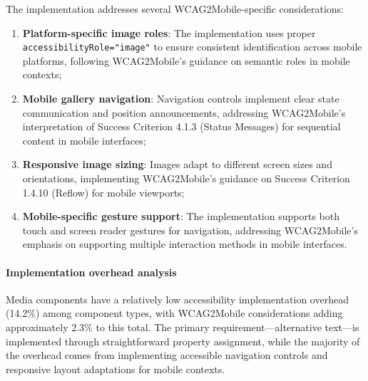 The implementation addresses several WCAG2Mobile-specific considerations:

\begin{enumerate}
    \item \textbf{Platform-specific image roles}: The implementation uses proper \texttt{accessibilityRole="image"} to ensure consistent identification across mobile platforms, following WCAG2Mobile's guidance on semantic roles in mobile contexts;
    
    \item \textbf{Mobile gallery navigation}: Navigation controls implement clear state communication and position announcements, addressing WCAG2Mobile's interpretation of Success Criterion 4.1.3 (Status Messages) for sequential content in mobile interfaces;
    
    \item \textbf{Responsive image sizing}: Images adapt to different screen sizes and orientations, implementing WCAG2Mobile's guidance on Success Criterion 1.4.10 (Reflow) for mobile viewports;
    
    \item \textbf{Mobile-specific gesture support}: The implementation supports both touch and screen reader gestures for navigation, addressing WCAG2Mobile's emphasis on supporting multiple interaction methods in mobile interfaces.
\end{enumerate}

\paragraph{Implementation overhead analysis}

Media components have a relatively low accessibility implementation overhead (14.2\%) among component types, with WCAG2Mobile considerations adding approximately 2.3\% to this total. The primary requirement—alternative text—is implemented through straightforward property assignment, while the majority of the overhead comes from implementing accessible navigation controls and responsive layout adaptations for mobile contexts.

